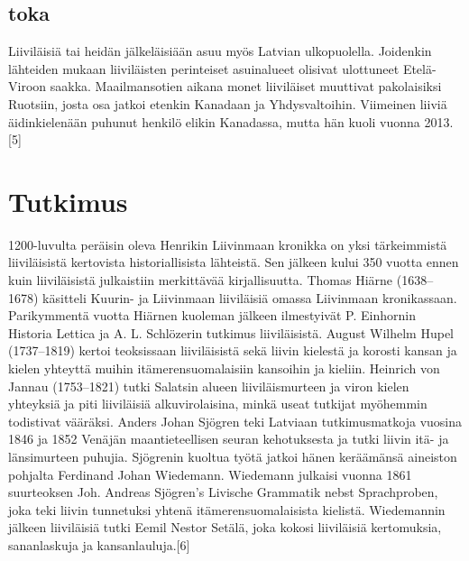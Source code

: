 \documentclass[a4paper]{article}
\theoremstyle{definition}
\theoremstyle{remark}
\begin{document}
\subsection*{toka}
Liiviläisiä tai heidän jälkeläisiään asuu myös Latvian ulkopuolella. Joidenkin lähteiden mukaan liiviläisten perinteiset asuinalueet olisivat ulottuneet Etelä-Viroon saakka. Maailmansotien aikana monet liiviläiset muuttivat pakolaisiksi Ruotsiin, josta osa jatkoi etenkin Kanadaan ja Yhdysvaltoihin. Viimeinen liiviä äidinkielenään puhunut henkilö elikin Kanadassa, mutta hän kuoli vuonna 2013.[5]


\section{Tutkimus}

1200-luvulta peräisin oleva Henrikin Liivinmaan kronikka on yksi tärkeimmistä liiviläisistä kertovista historiallisista lähteistä. Sen jälkeen kului 350 vuotta ennen kuin liiviläisistä julkaistiin merkittävää kirjallisuutta. Thomas Hiärne (1638–1678) käsitteli Kuurin- ja Liivinmaan liiviläisiä omassa Liivinmaan kronikassaan. Parikymmentä vuotta Hiärnen kuoleman jälkeen ilmestyivät P. Einhornin Historia Lettica ja A. L. Schlözerin tutkimus liiviläisistä. August Wilhelm Hupel (1737–1819) kertoi teoksissaan liiviläisistä sekä liivin kielestä ja korosti kansan ja kielen yhteyttä muihin itämerensuomalaisiin kansoihin ja kieliin. Heinrich von Jannau (1753–1821) tutki Salatsin alueen liiviläismurteen ja viron kielen yhteyksiä ja piti liiviläisiä alkuvirolaisina, minkä useat tutkijat myöhemmin todistivat vääräksi. Anders Johan Sjögren teki Latviaan tutkimusmatkoja vuosina 1846 ja 1852 Venäjän maantieteellisen seuran kehotuksesta ja tutki liivin itä- ja länsimurteen puhujia. Sjögrenin kuoltua työtä jatkoi hänen keräämänsä aineiston pohjalta Ferdinand Johan Wiedemann. Wiedemann julkaisi vuonna 1861 suurteoksen Joh. Andreas Sjögren's Livische Grammatik nebst Sprachproben, joka teki liivin tunnetuksi yhtenä itämerensuomalaisista kielistä. Wiedemannin jälkeen liiviläisiä tutki Eemil Nestor Setälä, joka kokosi liiviläisiä kertomuksia, sananlaskuja ja kansanlauluja.[6]
\end{document}
